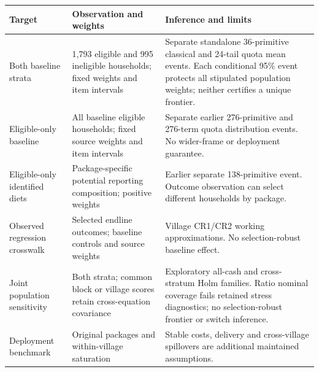 \begin{tabular}{p{}p{}p{}}
\toprule
Target & Observation and weights & Inference and limits \\
\midrule
Both baseline strata & 1,793 eligible and 995 ineligible households; fixed weights and item intervals & Separate standalone 36-primitive classical and 24-tail quota mean events. Each conditional 95\% event protects all stipulated population weights; neither certifies a unique frontier. \\
Eligible-only baseline & All baseline eligible households; fixed source weights and item intervals & Separate earlier 276-primitive and 276-term quota distribution events. No wider-frame or deployment guarantee. \\
Eligible-only identified diets & Package-specific potential reporting composition; positive weights & Earlier separate 138-primitive event. Outcome observation can select different households by package. \\
Observed regression crosswalk & Selected endline outcomes; baseline controls and source weights & Village CR1/CR2 working approximations. No selection-robust baseline effect. \\
Joint population sensitivity & Both strata; common block or village scores retain cross-equation covariance & Exploratory all-cash and cross-stratum Holm families. Ratio nominal coverage fails retained stress diagnostics; no selection-robust frontier or switch inference. \\
Deployment benchmark & Original packages and within-village saturation & Stable costs, delivery and cross-village spillovers are additional maintained assumptions. \\
\bottomrule
\end{tabular}
